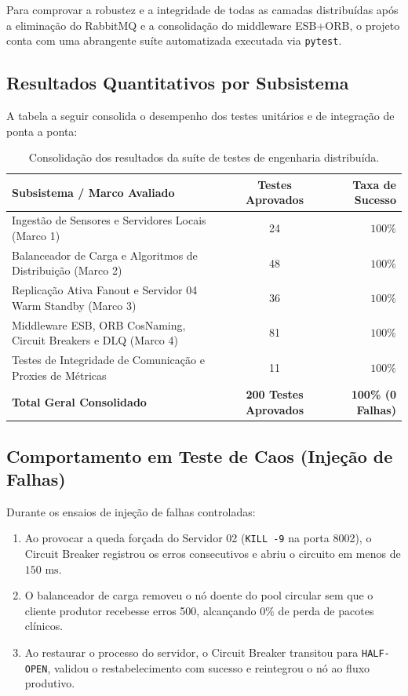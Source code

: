 \documentclass[11pt,a4paper]{article}
\begin{document}
Para comprovar a robustez e a integridade de todas as camadas distribuídas após a eliminação do RabbitMQ e a consolidação do middleware ESB+ORB, o projeto conta com uma abrangente suíte automatizada executada via \texttt{pytest}.

\subsection{Resultados Quantitativos por Subsistema}
A tabela a seguir consolida o desempenho dos testes unitários e de integração de ponta a ponta:

\begin{table}[H]
\centering
\small
\begin{tabularx}{\linewidth}{X c r}
\toprule
\textbf{Subsistema / Marco Avaliado} & \textbf{Testes Aprovados} & \textbf{Taxa de Sucesso} \\
\midrule
Ingestão de Sensores e Servidores Locais (Marco 1) & 24 & $100\%$ \\
Balanceador de Carga e Algoritmos de Distribuição (Marco 2) & 48 & $100\%$ \\
Replicação Ativa Fanout e Servidor 04 Warm Standby (Marco 3) & 36 & $100\%$ \\
Middleware ESB, ORB CosNaming, Circuit Breakers e DLQ (Marco 4) & 81 & $100\%$ \\
Testes de Integridade de Comunicação e Proxies de Métricas & 11 & $100\%$ \\
\midrule
\textbf{Total Geral Consolidado} & \textbf{200 Testes Aprovados} & \textbf{100\% (0 Falhas)} \\
\bottomrule
\end{tabularx}
\caption{Consolidação dos resultados da suíte de testes de engenharia distribuída.}
\end{table}

\subsection{Comportamento em Teste de Caos (Injeção de Falhas)}
Durante os ensaios de injeção de falhas controladas:
\begin{enumerate}
    \item Ao provocar a queda forçada do Servidor 02 (\texttt{KILL -9} na porta 8002), o Circuit Breaker registrou os erros consecutivos e abriu o circuito em menos de $150\text{ ms}$.
    \item O balanceador de carga removeu o nó doente do pool circular sem que o cliente produtor recebesse erros 500, alcançando $0\%$ de perda de pacotes clínicos.
    \item Ao restaurar o processo do servidor, o Circuit Breaker transitou para \texttt{HALF-OPEN}, validou o restabelecimento com sucesso e reintegrou o nó ao fluxo produtivo.
\end{enumerate}
\end{document}
